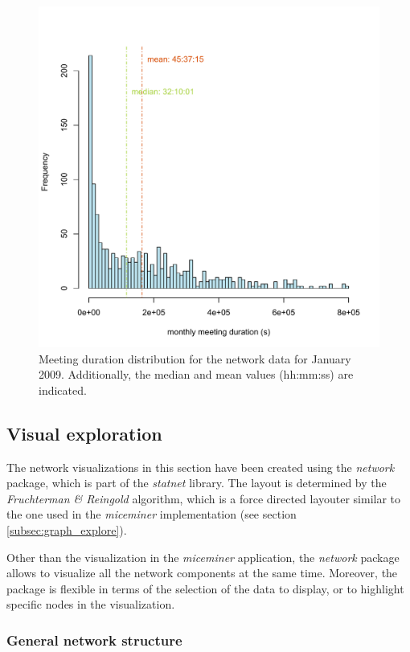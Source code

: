 \begin{figure}[htpb]
\begin{center}
  \includegraphics[width=.75\textwidth]{assets/pdf/meeting_frequency_january.pdf}
  \caption[Histogram of monthly meeting duration]{Meeting duration distribution for the network data for January 2009. Additionally, the median and mean values (hh:mm:ss) are indicated.}
  \label{fig:meeting_frequency_januray}
\end{center}
\end{figure}   

\subsection{Visual exploration}
\label{subsec:visual_exploration}

The network visualizations in this section have been created using the \textit{network}\cite{network:08} package, which is part of the \textit{statnet}\cite{statnet:03} library. The layout is determined by the \textit{Fruchterman \& Reingold}\cite{fruchterman:91} algorithm, which is a force directed layouter similar to the one used in the \textit{miceminer} implementation (see section \ref{subsec:graph_explore}).

Other than the visualization in the \textit{miceminer} application, the \textit{network} package allows to visualize all the network components at the same time. Moreover, the package is flexible in terms of the selection of the data to display, or to highlight specific nodes in the visualization.

\subsubsection{General network structure}
\label{subsubsec:vis_general}    


